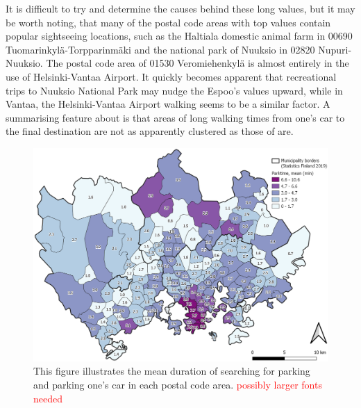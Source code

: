 It is difficult to try and determine the causes behind these long  values, but it may be worth noting, that many of the postal code areas with top values contain popular sightseeing locations, such as the Haltiala domestic animal farm in 00690 Tuomarinkylä-Torpparinmäki and the national park of Nuuksio in 02820 Nupuri-Nuuksio. The postal code area of 01530 Veromiehenkylä is almost entirely in the use of Helsinki-Vantaa Airport. It quickly becomes apparent that recreational trips to Nuuksio National Park may nudge the Espoo's  values upward, while in Vantaa, the Helsinki-Vantaa Airport walking seems to be a similar factor. A summarising feature about  is that areas of long walking times from one's car to the final destination are not as apparently clustered as those of  are.


\begin{figure}[H]%
    \centering
    \includegraphics[width=\textwidth]{images/thesis_postalvis_parkmean.png}
    \caption[Parktime, mean, in the reseach area]{This figure illustrates the mean duration of searching for parking and parking one's car in each postal code area. \textcolor{red}{possibly larger fonts needed}}%
    \label{fig:postalvis_parkmean}%
\end{figure}

